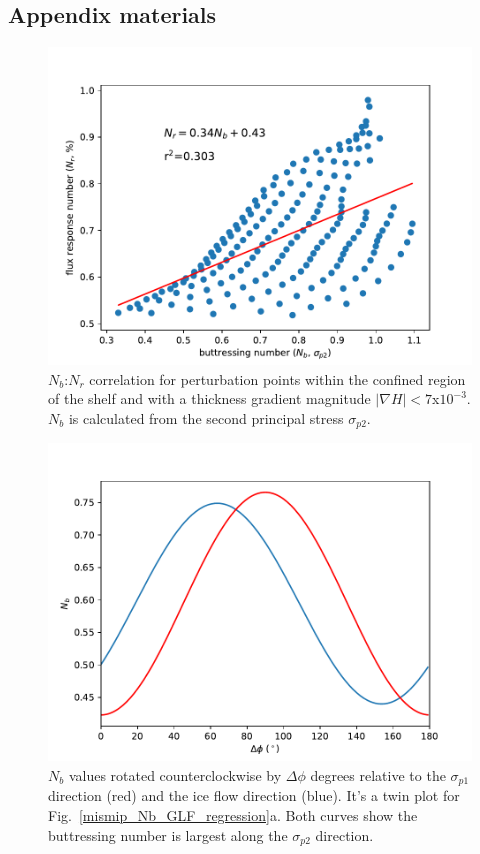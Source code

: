 \documentclass[review,oneside]{igs}
\begin{document}
\begin{appendices}
\section{Appendix materials}
\renewcommand{\thefigure}{A\arabic{figure}}
\setcounter{figure}{0}

\begin{figure}
	\centering
	\includegraphics[width=1\linewidth]{figs/sigma_p2_example.pdf}
	\caption{$N_b$:$N_r$ correlation for perturbation points within the confined region of the shelf and with a thickness gradient magnitude $\left|\nabla H\right|<7$x$10^{-3}$. $N_b$ is calculated from the second principal stress $\sigma_{p2}$.}
	\label{sigma_p2_example}
\end{figure}

\begin{figure}
	\centering
	\includegraphics[width=1\linewidth]{figs/Nb_Deltaphi.pdf}
	\caption{$N_b$ values rotated counterclockwise by $\Delta\phi$ degrees relative to the $\sigma_{p1}$ direction (red) and the ice flow direction (blue). It's a twin plot for Fig.~\ref{mismip_Nb_GLF_regression}a. Both curves show the buttressing number is largest along the $\sigma_{p2}$ direction.}
	\label{Nb_Deltaphi}
\end{figure}


\end{appendices}
\end{document}
